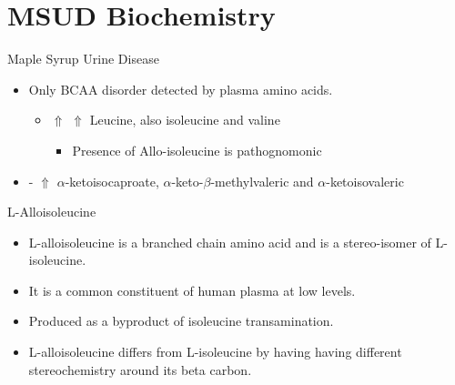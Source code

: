 \documentclass[presentation, smaller]{beamer}
\begin{document}
\section{MSUD Biochemistry}
\label{sec:orgheadline13}
\begin{frame}[label={sec:orgheadline4}]{Maple Syrup Urine Disease}
\begin{itemize}
\item Only BCAA disorder detected by plasma amino acids.
\begin{itemize}
\item \(\Uparrow\) \(\Uparrow\) Leucine, also isoleucine and valine
\begin{itemize}
\item Presence of Allo-isoleucine is pathognomonic
\end{itemize}
\end{itemize}
\item - \(\Uparrow\) \(\alpha\)-ketoisocaproate, \(\alpha\)-keto-\(\beta\)-methylvaleric and \(\alpha\)-ketoisovaleric
\end{itemize}
\end{frame}
\begin{frame}[label={sec:orgheadline5}]{L-Alloisoleucine}
\begin{itemize}
\item L-alloisoleucine is a branched chain amino acid and is a
stereo-isomer of L-isoleucine.
\item It is a common constituent of human plasma at low levels.
\item Produced as a byproduct of isoleucine transamination.
\item L-alloisoleucine differs from L-isoleucine by having having
different stereochemistry around its beta carbon.
\end{itemize}

\centering
{}
\end{frame}
\end{document}
